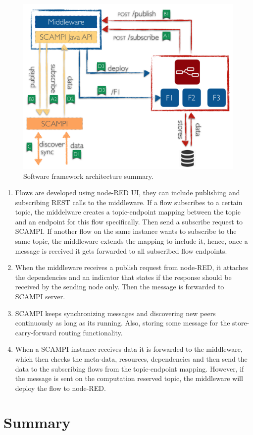 \begin{figure}[H]
	\centering
	\includegraphics[scale=0.5]{images/design.png}
	\caption{Software framework architecture summary. }
	\label{fig:design}
\end{figure}

\begin{enumerate}[label=(\Alph*)]
 
 \item Flows are developed using node-RED UI, they can include publishing and subscribing REST calls to the middleware. If a flow subscribes to a certain topic, the middelware creates  a topic-endpoint mapping between the topic and an endpoint for this flow specifically. Then send a subscribe request to SCAMPI. If another flow on the same instance wants to subscribe to the same topic, the middleware extends the mapping to include it, hence, once a message is received it gets forwarded to all subscribed flow endpoints. 

 \item When the middleware receives a publish request from node-RED, it attaches the dependencies and an indicator that states if the response should be received by the sending node only. Then the message is forwarded to SCAMPI server.

 \item SCAMPI keeps synchronizing messages and discovering new peers continuously as long as its running. Also, storing some message for the store-carry-forward routing functionality.

 \item When a SCAMPI instance receives data it is forwarded to the middleware, which then checks the meta-data, resources, dependencies and then send the data to the subscribing flows from the topic-endpoint mapping. However, if the message is sent on the computation reserved topic, the middleware will deploy the flow to node-RED.

\end{enumerate}

\section{Summary}


